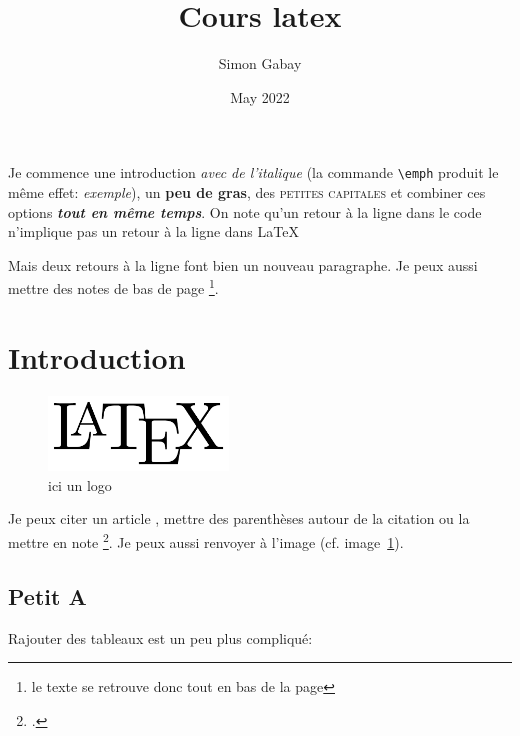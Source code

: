 \documentclass[paper=a4,
               fontsize=11pt,
               twoside, %
              ]{article}
\title{Cours latex}
\author{Simon Gabay}
\date{May 2022}
\begin{document}
    
    \maketitle
    
    Je commence une introduction \textit{avec de l'italique} (la commande \texttt{\textbackslash{}emph} produit le même effet: \emph{exemple}), un \textbf{peu de gras}, des \textsc{petites capitales} et combiner ces options \textbf{\textit{tout en même temps}}.
    On note qu'un retour à la ligne dans le code n'implique pas un retour à la ligne dans \LaTeX 
    
    Mais deux retours à la ligne font bien un nouveau paragraphe. Je peux aussi mettre des notes de bas de page \footnote{le texte se retrouve donc tout en bas de la page}.
    
    \section{Introduction}

    \begin{figure}[!htb]
        \centering
        \includegraphics[height=2cm]{images/logoLatex.png}
        \caption{ici un logo}
        \label{fig:logolatex}
    \end{figure}
    
     Je peux citer un article \cite{baptiste_transferring_2021}, mettre des parenthèses autour de la citation \parencite{baptiste_transferring_2021} ou la mettre en note \footcite{baptiste_transferring_2021}. Je peux aussi renvoyer à l'image (cf. image~\ref{fig:logolatex}).
     
    \subsection{Petit A}
    \label{petitA}
    Rajouter des tableaux est un peu plus compliqué:
    
\end{document}
